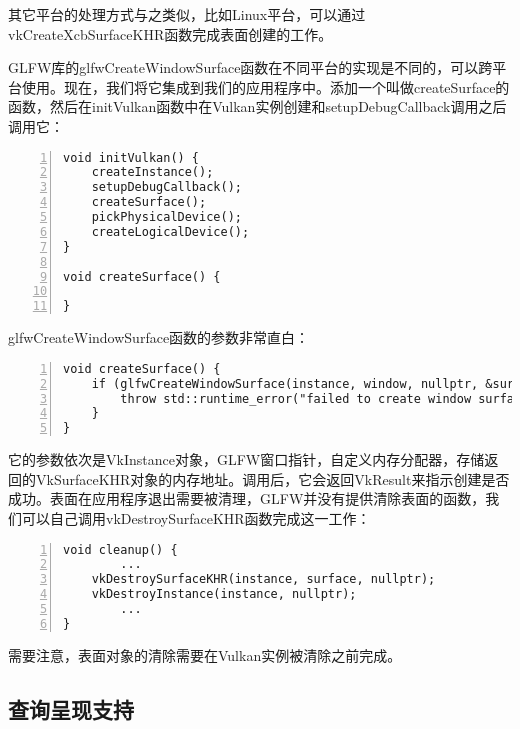 \documentclass{ctexart}
\begin{document}
其它平台的处理方式与之类似，比如Linux平台，可以通过vkCreateXcbSurfaceKHR函数完成表面创建的工作。

GLFW库的glfwCreateWindowSurface函数在不同平台的实现是不同的，可以跨平台使用。现在，我们将它集成到我们的应用程序中。添加一个叫做createSurface的函数，然后在initVulkan函数中在Vulkan实例创建和setupDebugCallback调用之后调用它：

\begin{lstlisting}[language={[ANSI]C},keywordstyle=\color{blue!70},commentstyle=\color{red!50!green!50!blue!50},frame=shadowbox, rulesepcolor=\color{red!20!green!20!blue!20},basicstyle=\small,numbers=left, numberstyle=\tiny,breaklines=true]
void initVulkan() {
	createInstance();
	setupDebugCallback();
	createSurface();
	pickPhysicalDevice();
	createLogicalDevice();
}

void createSurface() {

}
\end{lstlisting}

glfwCreateWindowSurface函数的参数非常直白：

\begin{lstlisting}[language={[ANSI]C},keywordstyle=\color{blue!70},commentstyle=\color{red!50!green!50!blue!50},frame=shadowbox, rulesepcolor=\color{red!20!green!20!blue!20},basicstyle=\small,numbers=left, numberstyle=\tiny,breaklines=true]
void createSurface() {
	if (glfwCreateWindowSurface(instance, window, nullptr, &surface) != VK_SUCCESS) {
		throw std::runtime_error("failed to create window surface!");
	}
}
\end{lstlisting}

它的参数依次是VkInstance对象，GLFW窗口指针，自定义内存分配器，存储返回的VkSurfaceKHR对象的内存地址。调用后，它会返回VkResult来指示创建是否成功。表面在应用程序退出需要被清理，GLFW并没有提供清除表面的函数，我们可以自己调用vkDestroySurfaceKHR函数完成这一工作：

\begin{lstlisting}[language={[ANSI]C},keywordstyle=\color{blue!70},commentstyle=\color{red!50!green!50!blue!50},frame=shadowbox, rulesepcolor=\color{red!20!green!20!blue!20},basicstyle=\small,numbers=left, numberstyle=\tiny,breaklines=true]
void cleanup() {
		...
	vkDestroySurfaceKHR(instance, surface, nullptr);
	vkDestroyInstance(instance, nullptr);
		...
}
\end{lstlisting}

需要注意，表面对象的清除需要在Vulkan实例被清除之前完成。

\subsection{查询呈现支持}
\end{document}

